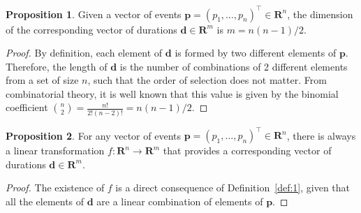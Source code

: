 \documentclass[12pt,oneside,a4paper,doublespacing]{article} %
\theoremstyle{definition}
\newtheorem{proposition}{Proposition}[section]
\begin{document}
\begin{proposition}
  Given a vector of events $\boldsymbol{p}=(p_1,\ldots,p_n)^\top\in\mathbf{R}^n$, the dimension of the corresponding vector of durations $\boldsymbol{d}\in\mathbf{R}^m$ is $m=n(n-1)/2$.
\end{proposition}

\begin{proof}
  By definition, each element of $\boldsymbol{d}$ is formed by two different elements of $\boldsymbol{p}$. Therefore, the length of $\boldsymbol{d}$ is the number of combinations of 2 different elements from a set of size $n$, such that the order of selection does not matter. From combinatorial theory, it is well known that this value is given by the binomial coefficient $\binom{n}{2}=\frac{n!}{2!(n-2)!}=n(n-1)/2$.
\end{proof}

\begin{proposition}
 For any vector of events $\boldsymbol{p}=(p_1,\ldots,p_n)^\top\in\mathbf{R}^n$, there is always a linear transformation $f:\mathbf{R}^n\to\mathbf{R}^m$ that provides a corresponding vector of durations $\boldsymbol{d}\in\mathbf{R}^m$.
 \label{prop:2}
\end{proposition}

\begin{proof}
 The existence of $f$ is a direct consequence of Definition~\ref{def:1}, given that all the elements of $\boldsymbol{d}$ are a linear combination of elements of $\boldsymbol{p}$. 
\end{proof}
\end{document}
